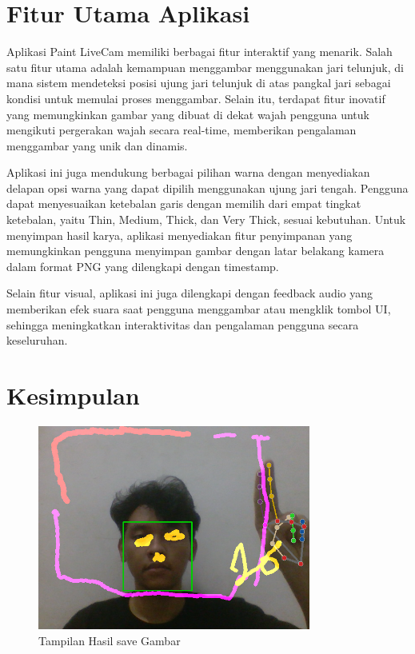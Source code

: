 \documentclass[11pt,a4paper]{article}
\begin{document}
\section{Fitur Utama Aplikasi}
Aplikasi Paint LiveCam memiliki berbagai fitur interaktif yang menarik. Salah satu fitur utama adalah kemampuan menggambar menggunakan jari telunjuk, di mana sistem mendeteksi posisi ujung jari telunjuk di atas pangkal jari sebagai kondisi untuk memulai proses menggambar. Selain itu, terdapat fitur inovatif yang memungkinkan gambar yang dibuat di dekat wajah pengguna untuk mengikuti pergerakan wajah secara real-time, memberikan pengalaman menggambar yang unik dan dinamis.

Aplikasi ini juga mendukung berbagai pilihan warna dengan menyediakan delapan opsi warna yang dapat dipilih menggunakan ujung jari tengah. Pengguna dapat menyesuaikan ketebalan garis dengan memilih dari empat tingkat ketebalan, yaitu Thin, Medium, Thick, dan Very Thick, sesuai kebutuhan. Untuk menyimpan hasil karya, aplikasi menyediakan fitur penyimpanan yang memungkinkan pengguna menyimpan gambar dengan latar belakang kamera dalam format PNG yang dilengkapi dengan timestamp.

Selain fitur visual, aplikasi ini juga dilengkapi dengan feedback audio yang memberikan efek suara saat pengguna menggambar atau mengklik tombol UI, sehingga meningkatkan interaktivitas dan pengalaman pengguna secara keseluruhan.

\section{Kesimpulan}

\FloatBarrier
    \begin{figure}[h]
        \centering
        \includegraphics[width=0.8\textwidth]{Figure/demo.png}
        \caption{Tampilan Hasil save Gambar}
        \label{fig:demo_image}
    \end{figure}
\end{document}
